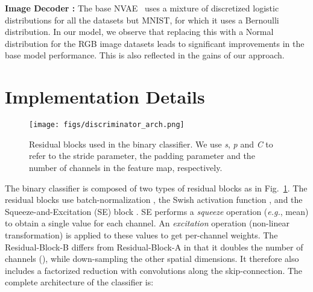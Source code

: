 \documentclass{article} \usepackage{iclr2021_conference,times}
\begin{document}
\textbf{Image Decoder :} The base NVAE~\citep{vahdat2020NVAE} uses a mixture of discretized logistic distributions for all the datasets but MNIST, for which it uses a Bernoulli distribution. In our model, we observe that replacing this with a Normal distribution for the RGB image datasets leads to significant improvements in the base model performance. This is also reflected in the gains of our approach. 


\vspace{-0.1cm}
\section{Implementation Details} \label{app:classifier_architecture}

\begin{figure}[t!]
\vspace{-1cm}
\centering
\texttt{[image: figs/discriminator\_arch.png]}
\vspace{-0.1cm}
\caption{Residual blocks used in the binary classifier. We use {\em s}, {\em p} and {\em C} to refer to the stride parameter, the padding parameter and the number of channels in the feature map, respectively.}
\label{fig:classifer_arch}
\end{figure}
\vspace{-0.1cm}
The binary classifier is composed of two types of residual blocks as in Fig.~\ref{fig:classifer_arch}. The residual blocks use batch-normalization \citep{ioffe2015batch}, the Swish activation function \citep{ramachandran2017swish}, and the Squeeze-and-Excitation (SE) block \citep{hu2018squeeze}. SE performs a {\em squeeze} operation ({\em e.g.}, mean) to obtain a single value for each channel. An {\em excitation} operation (non-linear transformation) is applied to these values to get per-channel weights. The Residual-Block-B differs from Residual-Block-A in that it doubles the number of channels (), while down-sampling the other spatial dimensions. It therefore also includes a factorized reduction with  convolutions along the skip-connection. The complete architecture of the classifier is:
\end{document}
